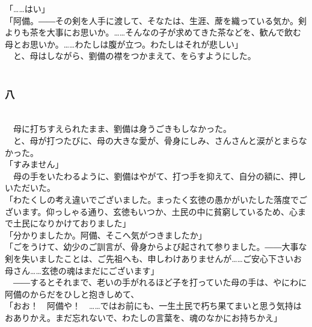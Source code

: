 \documentclass[
  paper=a5,
  fontsize=10pt,
  jafontsize=9.5pt,
  tate,                  %
  open_bracket_pos=nibu, %
]{jlreq}
\begin{document}
「……はい」\\


「阿備。――その剣を人手に渡して、そなたは、生涯、蓆を織っている気か。剣よりも茶を大事にお思いか。……そんなの子が求めてきた茶などを、歓んで飲む母とお思いか。……わたしは腹が立つ。わたしはそれが悲しい」\\


　と、母はしながら、劉備の襟をつかまえて、をらすようにした。\\

\\

\subsubsection{八}

\\


　母に打ちすえられたまま、劉備は身うごきもしなかった。\\


　と、母が打つたびに、母の大きな愛が、骨身にしみ、さんさんと涙がとまらなかった。\\


「すみません」\\


　母の手をいたわるように、劉備はやがて、打つ手を抑えて、自分の額に、押しいただいた。\\


「わたくしの考え違いでございました。まったく玄徳の愚かがいたした落度でございます。仰っしゃる通り、玄徳もいつか、土民の中に貧窮しているため、心まで土民になりかけておりました」\\


「分かりましたか。阿備、そこへ気がつきましたか」\\


「ごをうけて、幼少のご訓言が、骨身からよび起されて参りました。――大事な剣を失いましたことは、ご先祖へも、申しわけありませんが……ご安心下さいお母さん……玄徳の魂はまだにございます」\\


　――するとそれまで、老いの手がれるほど子を打っていた母の手は、やにわに阿備のからだをひしと抱きしめて、\\


「おお！　阿備や！　……ではお前にも、一生土民で朽ち果てまいと思う気持はおありかえ。まだ忘れないで、わたしの言葉を、魂のなかにお持ちかえ」\\
\end{document}
